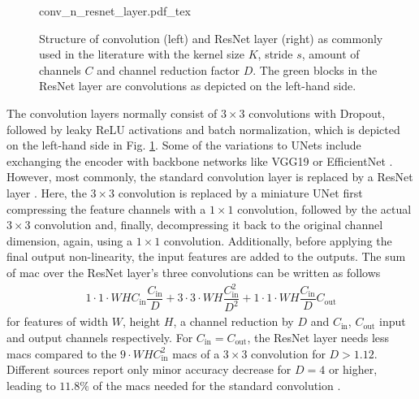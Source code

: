\begin{figure}
	\begin{center}
		{conv_n_resnet_layer.pdf_tex}
		\caption{\label{fig:conv_n_resnet_layer}Structure of convolution (left) and ResNet layer (right) as commonly used in the literature with the kernel size $K$, stride $s$, amount of channels $C$ and channel reduction factor $D$. The green blocks in the ResNet layer are convolutions as depicted on the left-hand side.}
	\end{center}
\end{figure} 
The convolution layers normally consist of $3 \times 3$ convolutions with Dropout, followed by leaky ReLU activations and batch normalization, which is depicted on the left-hand side in Fig. \ref{fig:conv_n_resnet_layer}. Some of the variations to UNets include exchanging the encoder with backbone networks like VGG19 \cite{simonyan2014very,wulff2018early} or EfficientNet \cite{tan2019efficientnet,philion2020lift}. However, most commonly, the standard convolution layer is replaced by a ResNet layer \cite{he2016deep,wirges2018evidential,reiher2020sim2real,roddick2020predicting,philion2020lift}. Here, the $3 \times 3$ convolution is replaced by a miniature UNet first compressing the feature channels with a $1\times 1$ convolution, followed by the actual $3 \times 3$ convolution and, finally, decompressing it back to the original channel dimension, again, using a $1 \times 1$ convolution. Additionally, before applying the final output non-linearity, the input features are added to the outputs. The sum of \gls{mac} over the ResNet layer's three convolutions can be written as follows
\begin{align}
	1\cdot 1\cdot WHC_{\text{in}}\dfrac{C_{\text{in}}}{D} + 3\cdot 3\cdot WH\dfrac{C_{\text{in}}^2}{D^2} +1\cdot 1\cdot WH\dfrac{C_{\text{in}}}{D}C_{\text{out}}
\end{align} 
for features of width $W$, height $H$, a channel reduction by $D$ and $C_{\text{in}}$, $C_{\text{out}}$ input and output channels respectively. For $C_{\text{in}} = C_{\text{out}}$, the ResNet layer needs less \gls{mac}s compared to the $9\cdot WHC_{\text{in}}^2$ \gls{mac}s of a $3 \times 3$ convolution for $D > 1.12$. Different sources report only minor accuracy decrease for $D = 4$ or higher, leading to $11.8\%$ of the \gls{mac}s needed for the standard convolution \cite{he2016deep,Bazarevsky2018}. 
\\\\

